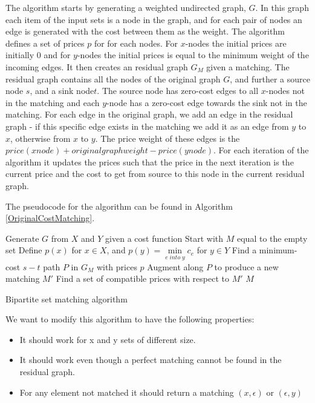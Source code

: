 \documentclass[11pt]{article}
\begin{document}
The \citet{bipartitecost} algorithm starts by generating a weighted undirected graph, $G$. In this graph each item of the input sets is a node in the graph, and for each pair of nodes an edge is generated with the cost between them as the weight. The algorithm defines a set of prices $p$ for for each nodes. For $x$-nodes the initial prices are initially 0 and for $y$-nodes the initial prices is equal to the minimum weight of the incoming edges. It then creates an residual graph $G_M$ given a matching. The residual graph contains all the nodes of the original graph $G$, and further a source node $s$, and a sink node$t$. The source node has zero-cost edges to all $x$-nodes not in the matching and each $y$-node has a zero-cost edge towards the sink not in the matching. For each edge in the original graph, we add an edge in the residual graph - if this specific edge exists in the matching we add it as an edge from $y$ to $x$, otherwise from $x$ to $y$. The price weight of these edges is the $price(xnode)+originalgraphweight-price(ynode)$. For each iteration of the algorithm it updates the prices such that the price in the next iteration is the current price and the cost to get from source to this node in the current residual graph.

The pseudocode for the algorithm can be found in Algorithm \ref{OriginalCostMatching}.


\begin{algorithm}
\begin{algorithmic}
	\State Generate $G$ from $X$ and $Y$ given a cost function
	\State Start with $M$ equal to the empty set
	\State Define $p(x)$ for $x \in X$, and  $p(y) = \underset{e \; into \; y}{\operatorname{min}} c_e$ for $y \in Y$
    	\State Find a minimum-cost $s-t$ path $P$ in $G_M$ with prices $p$
    	\State Augment along $P$ to produce a new matching $M'$
    	\State Find a set of compatible prices with respect to $M'$
    \EndWhile
	\State \Return $M$
\EndFunction
\end{algorithmic}
	\caption{Bipartite set matching algorithm}
	\label{OriginalCostMatching}
\end{algorithm}

We want to modify this algorithm to have the following properties:

\begin{itemize}
\item It should work for x and y sets of different size. 
\item It should work even though a perfect matching cannot be found in the residual graph.
\item For any element not matched it should return a matching $(x, \epsilon)$ or $(\epsilon, y)$
\end{itemize}
\end{document}
